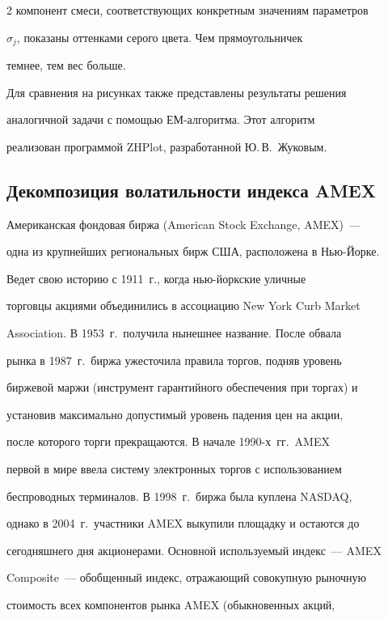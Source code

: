 \begin{multicols}{2}
компонент смеси, соответствующих конкретным значениям параметров


$\sigma_j$, показаны оттенками серого цвета. Чем прямоугольничек


темнее, тем вес больше.





Для сравнения на рисунках также представлены результаты решения


аналогичной задачи с по\-мощью ЕМ-алгоритма. Этот алгоритм


реализован программой ZHPlot, разработанной Ю.\,В.~Жуковым.





\subsection{Декомпозиция волатильности индекса AMEX}





Американская фондовая биржа (American Stock Exchange, AMEX)~---


одна из крупнейших региональных бирж США, расположена в Нью-Йорке.


Ведет свою историю с 1911~г., когда нью-йоркские уличные


торговцы акциями объединились в ассоциацию New York Curb Market


Association. В 1953~г.\ получила нынешнее название. После обвала


рынка в 1987~г.\ биржа ужесточила правила торгов, подняв уровень


биржевой маржи (инструмент гарантийного обеспечения при торгах) и


установив максимально допустимый уровень падения цен на акции,


после которого торги прекращаются. В начале 1990-х~гг.\ AMEX


первой в мире ввела систему электронных торгов с использованием


беспроводных терминалов. В 1998~г.\ биржа была куплена NASDAQ,


однако в 2004~г.\ участники AMEX выкупили площадку и остаются до


сегодняшнего дня акционерами. Основной используемый индекс~--- AMEX


Composite~--- обобщенный индекс, отражающий совокупную рыночную


стоимость всех компонентов рынка AMEX (обыкновенных акций,



\end{multicols}
